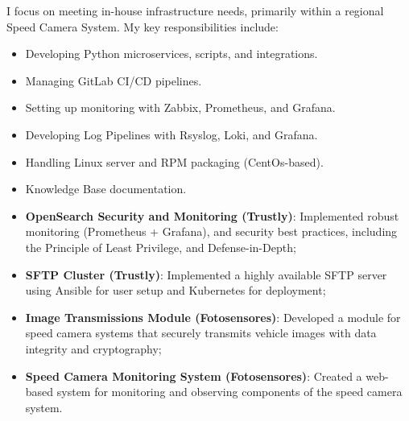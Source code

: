 \documentclass[10pt,a4paper]{altacv}
\begin{document}
\divider


I focus on meeting in-house infrastructure needs, primarily within a regional Speed Camera System. My key responsibilities include:

\bigskip

\begin{itemize}
    \item Developing Python microservices, scripts, and integrations.
    \item Managing GitLab CI/CD pipelines.
    \item Setting up monitoring with Zabbix, Prometheus, and Grafana.
    \item Developing Log Pipelines with Rsyslog, Loki, and Grafana.
    \item Handling Linux server and RPM packaging (CentOs-based).
    \item Knowledge Base documentation.
\end{itemize}


\begin{itemize}
    \item \textbf{OpenSearch Security and Monitoring (Trustly)}: Implemented robust monitoring (Prometheus + Grafana), and security best practices, including the Principle of Least Privilege, and Defense-in-Depth;
    \item \textbf{SFTP Cluster (Trustly)}: Implemented a highly available SFTP server using Ansible for user setup and Kubernetes for deployment;
    \item \textbf{Image Transmissions Module (Fotosensores)}: Developed a module for speed camera systems that securely transmits vehicle images with data integrity and cryptography;
    \item \textbf{Speed Camera Monitoring System (Fotosensores)}: Created a web-based system for monitoring and observing components of the speed camera system.
\end{itemize}

\clearpage
\end{document}
